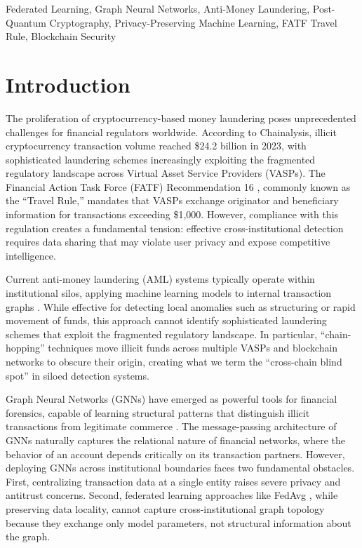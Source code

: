 \documentclass[conference]{IEEEtran}
\begin{document}
\begin{IEEEkeywords}
Federated Learning, Graph Neural Networks, Anti-Money Laundering, Post-Quantum Cryptography, Privacy-Preserving Machine Learning, FATF Travel Rule, Blockchain Security
\end{IEEEkeywords}

\section{Introduction}

The proliferation of cryptocurrency-based money laundering poses unprecedented challenges for financial regulators worldwide. According to Chainalysis, illicit cryptocurrency transaction volume reached \$24.2 billion in 2023, with sophisticated laundering schemes increasingly exploiting the fragmented regulatory landscape across Virtual Asset Service Providers (VASPs). The Financial Action Task Force (FATF) Recommendation 16 \cite{fatf2021travel}, commonly known as the ``Travel Rule,'' mandates that VASPs exchange originator and beneficiary information for transactions exceeding \$1,000. However, compliance with this regulation creates a fundamental tension: effective cross-institutional detection requires data sharing that may violate user privacy and expose competitive intelligence.

Current anti-money laundering (AML) systems typically operate within institutional silos, applying machine learning models to internal transaction graphs \cite{jullum2020detecting}. While effective for detecting local anomalies such as structuring or rapid movement of funds, this approach cannot identify sophisticated laundering schemes that exploit the fragmented regulatory landscape. In particular, ``chain-hopping'' techniques move illicit funds across multiple VASPs and blockchain networks to obscure their origin, creating what we term the ``cross-chain blind spot'' in siloed detection systems.

Graph Neural Networks (GNNs) have emerged as powerful tools for financial forensics, capable of learning structural patterns that distinguish illicit transactions from legitimate commerce \cite{weber2019anti}. The message-passing architecture of GNNs naturally captures the relational nature of financial networks, where the behavior of an account depends critically on its transaction partners. However, deploying GNNs across institutional boundaries faces two fundamental obstacles. First, centralizing transaction data at a single entity raises severe privacy and antitrust concerns. Second, federated learning approaches like FedAvg \cite{mcmahan2017communication}, while preserving data locality, cannot capture cross-institutional graph topology because they exchange only model parameters, not structural information about the graph.
\end{document}
